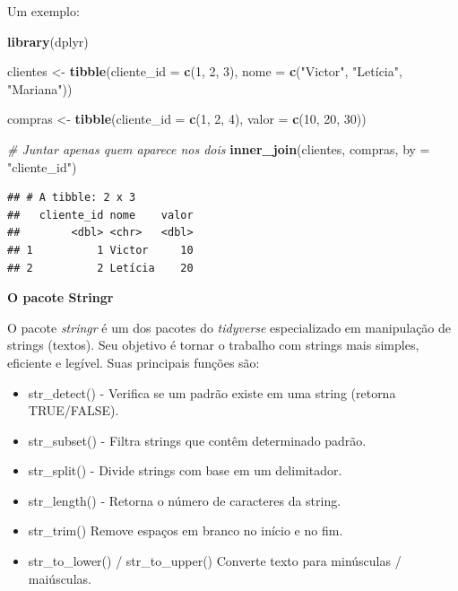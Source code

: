 \documentclass[
]{book}
\newenvironment{Shaded}{\begin{snugshade}}{\end{snugshade}}
\newcommand{\AttributeTok}[1]{\textcolor[rgb]{0.13,0.29,0.53}{#1}}
\newcommand{\CommentTok}[1]{\textcolor[rgb]{0.56,0.35,0.01}{\textit{#1}}}
\newcommand{\DecValTok}[1]{\textcolor[rgb]{0.00,0.00,0.81}{#1}}
\newcommand{\FunctionTok}[1]{\textcolor[rgb]{0.13,0.29,0.53}{\textbf{#1}}}
\newcommand{\NormalTok}[1]{#1}
\newcommand{\OtherTok}[1]{\textcolor[rgb]{0.56,0.35,0.01}{#1}}
\newcommand{\StringTok}[1]{\textcolor[rgb]{0.31,0.60,0.02}{#1}}
\providecommand{\tightlist}{%
  \setlength{\itemsep}{0pt}\setlength{\parskip}{0pt}}
\begin{document}
Um exemplo:

\begin{Shaded}
\begin{Highlighting}[]
\FunctionTok{library}\NormalTok{(dplyr)}

\NormalTok{clientes }\OtherTok{\textless{}{-}} \FunctionTok{tibble}\NormalTok{(}\AttributeTok{cliente\_id =} \FunctionTok{c}\NormalTok{(}\DecValTok{1}\NormalTok{, }\DecValTok{2}\NormalTok{, }\DecValTok{3}\NormalTok{),}
                   \AttributeTok{nome =} \FunctionTok{c}\NormalTok{(}\StringTok{"Victor"}\NormalTok{, }\StringTok{"Letícia"}\NormalTok{, }\StringTok{"Mariana"}\NormalTok{))}

\NormalTok{compras }\OtherTok{\textless{}{-}} \FunctionTok{tibble}\NormalTok{(}\AttributeTok{cliente\_id =} \FunctionTok{c}\NormalTok{(}\DecValTok{1}\NormalTok{, }\DecValTok{2}\NormalTok{, }\DecValTok{4}\NormalTok{),}
                  \AttributeTok{valor =} \FunctionTok{c}\NormalTok{(}\DecValTok{10}\NormalTok{, }\DecValTok{20}\NormalTok{, }\DecValTok{30}\NormalTok{))}

\CommentTok{\# Juntar apenas quem aparece nos dois}
\FunctionTok{inner\_join}\NormalTok{(clientes, compras, }\AttributeTok{by =} \StringTok{"cliente\_id"}\NormalTok{)}
\end{Highlighting}
\end{Shaded}

\begin{verbatim}
## # A tibble: 2 x 3
##   cliente_id nome    valor
##        <dbl> <chr>   <dbl>
## 1          1 Victor     10
## 2          2 Letícia    20
\end{verbatim}

\textbf{O pacote Stringr}

O pacote \emph{stringr} é um dos pacotes do \emph{tidyverse} especializado em manipulação de strings (textos). Seu objetivo é tornar o trabalho com strings mais simples, eficiente e legível. Suas principais funções são:

\begin{itemize}
\tightlist
\item
  str\_detect() - Verifica se um padrão existe em uma string (retorna TRUE/FALSE).
\item
  str\_subset() - Filtra strings que contêm determinado padrão.
\item
  str\_split() - Divide strings com base em um delimitador.
\item
  str\_length() - Retorna o número de caracteres da string.
\item
  str\_trim() Remove espaços em branco no início e no fim.
\item
  str\_to\_lower() / str\_to\_upper() Converte texto para minúsculas / maiúsculas.
\end{itemize}
\end{document}
